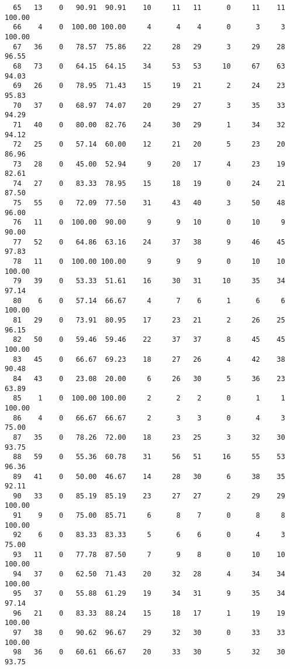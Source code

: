 \begin{verbatim}
  65   13    0   90.91  90.91    10     11   11      0     11    11   100.00
  66    4    0  100.00 100.00     4      4    4      0      3     3   100.00
  67   36    0   78.57  75.86    22     28   29      3     29    28    96.55
  68   73    0   64.15  64.15    34     53   53     10     67    63    94.03
  69   26    0   78.95  71.43    15     19   21      2     24    23    95.83
  70   37    0   68.97  74.07    20     29   27      3     35    33    94.29
  71   40    0   80.00  82.76    24     30   29      1     34    32    94.12
  72   25    0   57.14  60.00    12     21   20      5     23    20    86.96
  73   28    0   45.00  52.94     9     20   17      4     23    19    82.61
  74   27    0   83.33  78.95    15     18   19      0     24    21    87.50
  75   55    0   72.09  77.50    31     43   40      3     50    48    96.00
  76   11    0  100.00  90.00     9      9   10      0     10     9    90.00
  77   52    0   64.86  63.16    24     37   38      9     46    45    97.83
  78   11    0  100.00 100.00     9      9    9      0     10    10   100.00
  79   39    0   53.33  51.61    16     30   31     10     35    34    97.14
  80    6    0   57.14  66.67     4      7    6      1      6     6   100.00
  81   29    0   73.91  80.95    17     23   21      2     26    25    96.15
  82   50    0   59.46  59.46    22     37   37      8     45    45   100.00
  83   45    0   66.67  69.23    18     27   26      4     42    38    90.48
  84   43    0   23.08  20.00     6     26   30      5     36    23    63.89
  85    1    0  100.00 100.00     2      2    2      0      1     1   100.00
  86    4    0   66.67  66.67     2      3    3      0      4     3    75.00
  87   35    0   78.26  72.00    18     23   25      3     32    30    93.75
  88   59    0   55.36  60.78    31     56   51     16     55    53    96.36
  89   41    0   50.00  46.67    14     28   30      6     38    35    92.11
  90   33    0   85.19  85.19    23     27   27      2     29    29   100.00
  91    9    0   75.00  85.71     6      8    7      0      8     8   100.00
  92    6    0   83.33  83.33     5      6    6      0      4     3    75.00
  93   11    0   77.78  87.50     7      9    8      0     10    10   100.00
  94   37    0   62.50  71.43    20     32   28      4     34    34   100.00
  95   37    0   55.88  61.29    19     34   31      9     35    34    97.14
  96   21    0   83.33  88.24    15     18   17      1     19    19   100.00
  97   38    0   90.62  96.67    29     32   30      0     33    33   100.00
  98   36    0   60.61  66.67    20     33   30      5     32    30    93.75

\end{verbatim}
